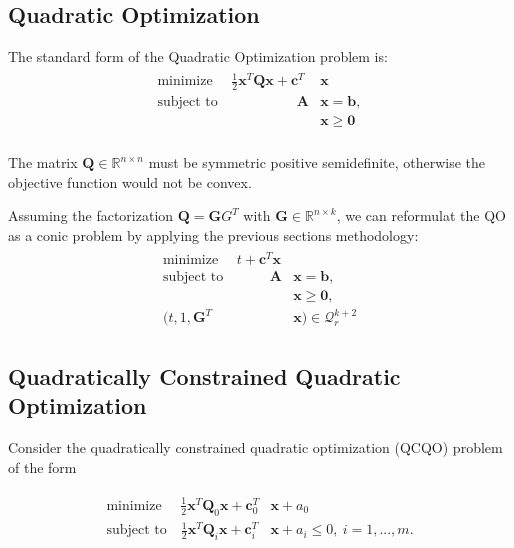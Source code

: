 \documentclass{article}
\begin{document}
\subsection{Quadratic Optimization}
The standard form of the Quadratic Optimization problem is:
\begin{align}
  \begin{split}
    \text{minimize ~~~} \frac{1}{2}\mathbf{x}^T\mathbf{Q}\mathbf{x}+\mathbf{c}^T&\mathbf{x} \\
    \text{subject to ~~~~~~~~~~~~~~~ } \mathbf{A}&\mathbf{x}=\mathbf{b}, \\
    &\mathbf{x}\geq\mathbf{0} \\
  \end{split}
\end{align}

The matrix $\mathbf{Q} \in \mathbb{R}^{n\times n}$ must be symmetric positive semidefinite,
otherwise the objective function would not be convex.

Assuming the factorization $\mathbf{Q}=\mathbf{G}{G}^T$ with
$\mathbf{G}\in\mathbb{R}^{n\times k}$, we can reformulat the QO as a conic problem by applying
the previous sections methodology:
\begin{align}
  \begin{split}
    \text{minimize ~~~} t+\mathbf{c}^T\mathbf{x} \\
    \text{subject to ~~~~~~~~ } \mathbf{A}&\mathbf{x}=\mathbf{b}, \\
    &\mathbf{x}\geq\mathbf{0}, \\
    (t,1,\mathbf{G}^T&\mathbf{x}) \in \mathcal{Q}_r^{k+2}
  \end{split}
\end{align}

\subsection{Quadratically Constrained Quadratic Optimization}
Consider the quadratically constrained quadratic optimization (QCQO) problem of the form

\begin{align}
  \begin{split}
    \text{minimize ~~~} \frac{1}{2}\mathbf{x}^T\mathbf{Q}_0\mathbf{x}+\mathbf{c}_0^T&\mathbf{x} + a_0 \\
    \text{subject to ~ } \frac{1}{2}\mathbf{x}^T\mathbf{Q}_i\mathbf{x}+\mathbf{c}_i^T&\mathbf{x} + a_i \leq 0,~i=1,...,m. \\
  \end{split}
\end{align}
\end{document}
